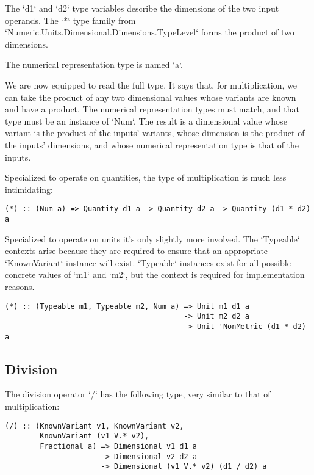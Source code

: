 \documentclass[11pt]{report}
\begin{document}
The `d1` and `d2` type variables describe the dimensions of the two input operands. The `*` type family from `Numeric.Units.Dimensional.Dimensions.TypeLevel`
forms the product of two dimensions.

The numerical representation type is named `a`.

We are now equipped to read the full type. It says that, for multiplication, we can take the product of any two dimensional values whose
variants are known and have a product. The numerical representation types must match, and that type must be an instance of `Num`. The result is a dimensional value
whose variant is the product of the inputs' variants, whose dimension is the product of the inputs' dimensions, and whose numerical representation
type is that of the inputs.

Specialized to operate on quantities, the type of multiplication is much less intimidating:

\begin{lstlisting}
(*) :: (Num a) => Quantity d1 a -> Quantity d2 a -> Quantity (d1 * d2) a
\end{lstlisting}

Specialized to operate on units it's only slightly more involved. The `Typeable` contexts arise because they are
required to ensure that an appropriate `KnownVariant` instance will exist. `Typeable` instances exist for all
possible concrete values of `m1` and `m2`, but the context is required for implementation reasons.

\begin{lstlisting}
(*) :: (Typeable m1, Typeable m2, Num a) => Unit m1 d1 a
                                         -> Unit m2 d2 a
                                         -> Unit 'NonMetric (d1 * d2) a
\end{lstlisting}

\subsection{Division}

The division operator `/` has the following type, very similar to that of multiplication:

\begin{lstlisting}
(/) :: (KnownVariant v1, KnownVariant v2,
        KnownVariant (v1 V.* v2),
        Fractional a) => Dimensional v1 d1 a
                      -> Dimensional v2 d2 a
                      -> Dimensional (v1 V.* v2) (d1 / d2) a
\end{lstlisting}
\end{document}
